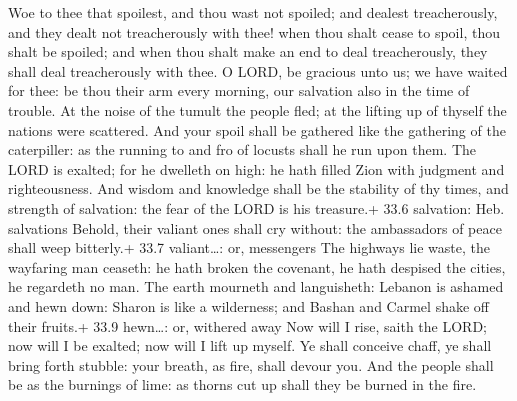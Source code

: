  Woe to thee that spoilest, and thou wast not spoiled; and
dealest treacherously, and they dealt not treacherously with thee! when
thou shalt cease to spoil, thou shalt be spoiled; and when thou shalt
make an end to deal treacherously, they shall deal treacherously with
thee.  O LORD, be gracious unto us; we have waited for thee:
be thou their arm every morning, our salvation also in the time of
trouble.  At the noise of the tumult the people fled; at the
lifting up of thyself the nations were scattered.  And your
spoil shall be gathered like the gathering of the caterpiller: as the
running to and fro of locusts shall he run upon them.  The
LORD is exalted; for he dwelleth on high: he hath filled Zion with
judgment and righteousness.  And wisdom and knowledge shall
be the stability of thy times, and strength of salvation: the fear of
the LORD is his treasure.+ 33.6 salvation: Heb. salvations 
Behold, their valiant ones shall cry without: the ambassadors of peace
shall weep bitterly.+ 33.7 valiant\ldots: or, messengers 
The highways lie waste, the wayfaring man ceaseth: he hath broken the
covenant, he hath despised the cities, he regardeth no man. 
The earth mourneth and languisheth: Lebanon is ashamed and hewn down:
Sharon is like a wilderness; and Bashan and Carmel shake off their
fruits.+ 33.9 hewn\ldots: or, withered away  Now will I
rise, saith the LORD; now will I be exalted; now will I lift up myself.
 Ye shall conceive chaff, ye shall bring forth stubble:
your breath, as fire, shall devour you.  And the people
shall be as the burnings of lime: as thorns cut up shall they be burned
in the fire.

